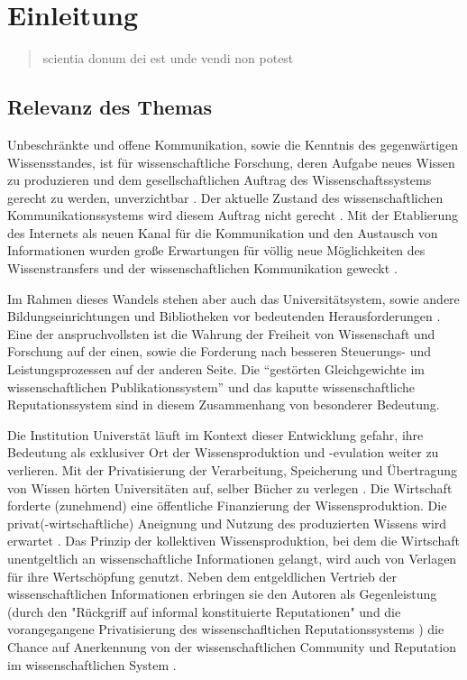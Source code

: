 \chapter{Einleitung} 

\begin{quote}
scientia donum dei est unde vendi non potest
\end{quote}

\section{Relevanz des Themas} 

Unbeschränkte und offene Kommunikation, sowie die Kenntnis des gegenwärtigen Wissensstandes, ist für wissenschaftliche Forschung, deren Aufgabe neues Wissen zu produzieren und dem gesellschaftlichen Auftrag des Wissenschaftssystems gerecht zu werden, unverzichtbar \cite{Hanekop_2014} \cite{glaeser2006} \cite{gibbons_1994} \cite{Luhmann1998}. Der aktuelle Zustand des wissenschaftlichen Kommunikationssystems wird diesem Auftrag nicht gerecht \cite{Schekman_2013}. Mit der Etablierung des Internets als neuen Kanal für die Kommunikation und den Austausch von Informationen wurden große Erwartungen für völlig neue Möglichkeiten des Wissenstransfers und der wissenschaftlichen Kommunikation geweckt \cite{Hanekop_2014} \cite{schulze_2013_open} \cite{albert_2006_open_implications} \cite{Goodrum_2001} \cite{Lawrence_1999}.

Im Rahmen dieses Wandels stehen aber auch das Universitätsystem, sowie andere Bildungseinrichtungen und Bibliotheken vor bedeutenden Herausforderungen \cite{Harter2006} \cite{Gu_don_2004} \cite{osterloh2008anreize}. Eine der anspruchvollsten ist die Wahrung der Freiheit von Wissenschaft und Forschung auf der einen, sowie die Forderung nach besseren Steuerungs- und Leistungsprozessen \cite{Adler_2009} \cite{gibbons_1994} auf der anderen Seite. Die “gestörten Gleichgewichte im wissenschaftlichen Publikationssystem” \cite{cite:0} und das kaputte wissenschaftliche Reputationssystem \cite{suchen} sind in diesem Zusammenhang von besonderer Bedeutung. 

Die Institution Universtät läuft im Kontext dieser Entwicklung gefahr, ihre Bedeutung als exklusiver Ort der Wissensproduktion \cite{suchen} und -evulation \cite{suchen} weiter zu verlieren. Mit der Privatisierung der Verarbeitung, Speicherung und Übertragung von Wissen hörten Universitäten auf, selber Bücher zu verlegen \cite{cite:0}. Die Wirtschaft forderte (zunehmend) eine öffentliche Finanzierung der Wissensproduktion. Die privat(-wirtschaftliche) Aneignung und Nutzung des produzierten Wissens wird erwartet \cite{cite:2}. Das Prinzip der kollektiven Wissensproduktion, bei dem die Wirtschaft unentgeltlich an wissenschaftliche Informationen gelangt, wird auch von Verlagen für ihre Wertschöpfung genutzt. Neben dem entgeldlichen Vertrieb der wissenschaftlichen Informationen erbringen sie den Autoren als Gegenleistung (durch den "Rückgriff auf informal konstituierte Reputationen" \cite{luhmann_1970_selbststeuerung} und die vorangegangene Privatisierung des wissenschafltichen Reputationssystems \cite{suchen}) die Chance auf Anerkennung von der wissenschaftlichen Community und Reputation im wissenschaftlichen System \cite{cite:21a}. 

